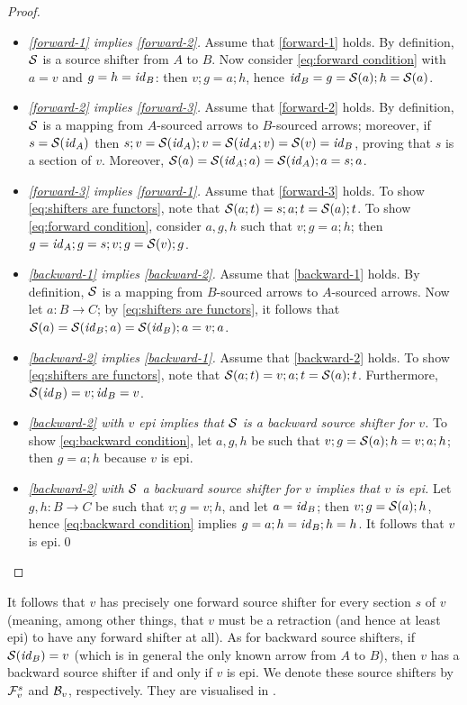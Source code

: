 \begin{proof}~
\begin{itemize}
\item \emph{\ref{forward-1} implies \ref{forward-2}.}
%
Assume that \ref{forward-1} holds. By definition, $\mathcal{S}$ is a source shifter from $A$ to $B$. Now consider \eqref{eq:forward condition} with $a=v$ and $g=h=\mathit{id}_B$: then $v;g=a;h$, hence $\mathit{id}_B=g = \mathcal{S}(a);h=\mathcal{S}(a)$.

\item \emph{\ref{forward-2} implies \ref{forward-3}.}
%
Assume that \ref{forward-2} holds. By definition, $\mathcal{S}$ is a mapping from $A$-sourced arrows to $B$-sourced arrows; moreover, if $s=\mathcal{S}(\mathit{id}_A)$ then $s;v=\mathcal{S}(\mathit{id}_A);v=\mathcal{S}(\mathit{id}_A;v)=\mathcal{S}(v)=\mathit{id}_B$, proving that $s$ is a section of $v$. Moreover, $\mathcal{S}(a)=\mathcal{S}(\mathit{id}_A;a)=\mathcal{S}(\mathit{id}_A);a=s;a$.

\item \emph{\ref{forward-3} implies \ref{forward-1}.}
%
Assume that \ref{forward-3} holds. To show \eqref{eq:shifters are functors}, note that $\mathcal{S}(a;t)=s;a;t=\mathcal{S}(a);t$. To show \eqref{eq:forward condition}, consider $a,g,h$ such that $v;g=a;h$; then $g=\mathit{id}_A;g=s;v;g=\mathcal{S}(v);g$.

\item \emph{\ref{backward-1} implies \ref{backward-2}.}
%
Assume that \ref{backward-1} holds. By definition, $\mathcal{S}$ is a mapping from $B$-sourced arrows to $A$-sourced arrows. Now let $a:B\to C$; by \eqref{eq:shifters are functors}, it follows that $\mathcal{S}(a)=\mathcal{S}(\mathit{id}_B;a)=\mathcal{S}(\mathit{id}_B);a=v;a$.

\item \emph{\ref{backward-2} implies \ref{backward-1}.}
%
Assume that \ref{backward-2} holds. To show \eqref{eq:shifters are functors}, note that $\mathcal{S}(a;t)=v;a;t=\mathcal{S}(a);t$. Furthermore, $\mathcal{S}(\mathit{id}_B)=v;\mathit{id}_B=v$.

\item \emph{\ref{backward-2} with $v$ epi implies that $\mathcal{S}$ is a backward source shifter for $v$.} To show \eqref{eq:backward condition}, let $a,g,h$ be such that $v;g=\mathcal{S}(a);h=v;a;h$; then $g=a;h$ because $v$ is epi.

\item \emph{\ref{backward-2} with $\mathcal{S}$ a backward source shifter for $v$ implies that $v$ is epi.} Let $g,h:B\to C$ be such that $v;g=v;h$, and let $a=\mathit{id}_B$; then $v;g=\mathcal{S}(a);h$, hence \eqref{eq:backward condition} implies $g=a;h=\mathit{id}_B;h=h$. It follows that $v$ is epi.\qed
\end{itemize}
\end{proof}
%
It follows that $v$ has precisely one forward source shifter for every section $s$ of $v$ (meaning, among other things, that $v$ must be a retraction (and hence at least epi) to have any forward shifter at all). As for backward source shifters, if $\mathcal{S}(\mathit{id}_B)=v$ (which is in general the only known arrow from $A$ to $B$), then $v$ has a backward source shifter if and only if $v$ is epi. We denote these source shifters by $\mathcal{F}_v^s$ and $\mathcal{B}_v$, respectively. They are visualised in .

